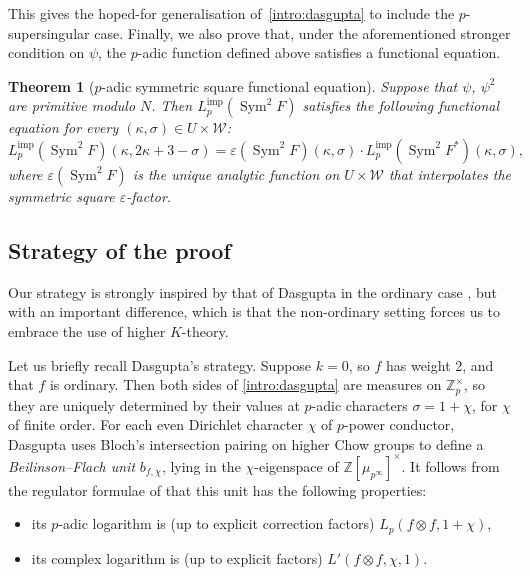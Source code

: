 \documentclass[11pt, a4paper, reqno]{amsart}
\theoremstyle{definition}
\theoremstyle{plain}
\newtheorem{thmintro}{Theorem}
\theoremstyle{remark}
\DeclareMathOperator{\Sym}{Sym}
\newcommand{\numberset}{\mathbb}
\newcommand{\Z}{\numberset{Z}}
\renewcommand{\epsilon}{\varepsilon}
\newcommand{\Weight}{\mathcal{W}}
\newcommand{\Limp}{L^{\mathrm{imp}}}
\begin{document}
  This gives the hoped-for generalisation of~\eqref{intro:dasgupta} to include the $p$-supersingular case. Finally, we also prove that, under the aforementioned stronger condition on $\psi$, the $p$-adic function defined above satisfies a functional equation.

  \begin{thmintro}[$p$-adic symmetric square functional equation]
   \label{intro:final3}
   Suppose that $\psi$, $\psi^2$ are primitive modulo $N$. Then $\Limp_p(\Sym^2 F)$ satisfies the following functional equation for every $(\kappa, \sigma)\in U\times\Weight$:
   \[
    \Limp_p(\Sym^2 F)(\kappa,2\kappa + 3 - \sigma) = \epsilon(\Sym^2 F)(\kappa, \sigma) \cdot \Limp_p(\Sym^2 F^*)(\kappa,\sigma),
   \]
   where $\epsilon(\Sym^2 F)$ is the unique analytic function on $U \times \Weight$ that interpolates the symmetric square $\epsilon$-factor.
  \end{thmintro}

 \subsection{Strategy of the proof}

  Our strategy is strongly inspired by that of Dasgupta in the ordinary case \cite{Dasgupta-factorization}, but with an important difference, which is that the non-ordinary setting forces us to embrace the use of higher $K$-theory.

  Let us briefly recall Dasgupta's strategy. Suppose $k = 0$, so $f$ has weight 2, and that $f$ is ordinary. Then both sides of \eqref{intro:dasgupta} are measures on $\Z_p^\times$, so they are uniquely determined by their values at $p$-adic characters $\sigma = 1 + \chi$, for $\chi$ of finite order. For each even Dirichlet character $\chi$ of $p$-power conductor, Dasgupta uses Bloch's intersection pairing on higher Chow groups to define a \emph{Beilinson--Flach unit} $b_{f, \chi}$, lying in the $\chi$-eigenspace of $\Z[\mu_{p^\infty}]^\times$. It follows from the regulator formulae of \cite{bertolinidarmon14, leiloefflerzerbes14} that this unit has the following properties:
  \begin{itemize}
   \item its $p$-adic logarithm is (up to explicit correction factors) $L_p(f \otimes f, 1 + \chi)$,
   \item its complex logarithm is (up to explicit factors) $L'(f \otimes f, \chi, 1)$.
  \end{itemize}
\end{document}
